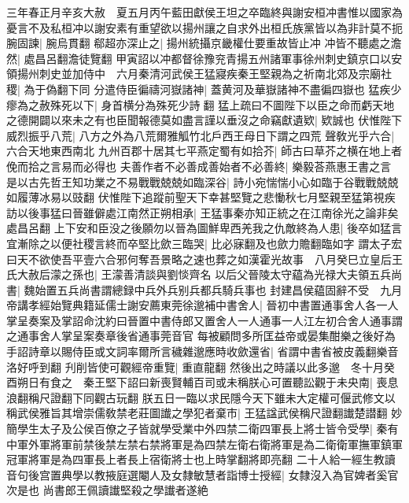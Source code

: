 三年春正月辛亥大赦　夏五月丙午藍田獻侯王坦之卒臨終與謝安桓冲書惟以國家為憂言不及私桓冲以謝安素有重望欲以揚州讓之自求外出桓氏族黨皆以為非計莫不扼腕固諫|{
	腕烏貫翻}
郗超亦深止之|{
	揚州統攝京畿權仕要重故皆止冲}
冲皆不聽處之澹然|{
	處昌呂翻澹徒覽翻}
甲寅詔以冲都督徐豫兖青揚五州諸軍事徐州刺史鎮京口以安領揚州刺史並加侍中　六月秦清河武侯王猛寢疾秦王堅親為之祈南北郊及宗廟社稷|{
	為于偽翻下同}
分遣侍臣徧禱河嶽諸神|{
	蓋黄河及華嶽諸神不盡徧四嶽也}
猛疾少瘳為之赦殊死以下|{
	身首横分為殊死少詩翻}
猛上疏曰不圖陛下以臣之命而虧天地之德開闢以來未之有也臣聞報德莫如盡言謹以垂沒之命竊獻遺欵|{
	欵誠也}
伏惟陛下威烈振乎八荒|{
	八方之外為八荒爾雅觚竹北戶西王母日下謂之四荒}
聲敎光乎六合|{
	六合天地東西南北}
九州百郡十居其七平燕定蜀有如拾芥|{
	師古曰草芥之横在地上者俛而拾之言易而必得也}
夫善作者不必善成善始者不必善終|{
	樂毅荅燕惠王書之言}
是以古先哲王知功業之不易戰戰兢兢如臨深谷|{
	詩小宛惴惴小心如臨于谷戰戰兢兢如履薄冰易以豉翻}
伏惟陛下追蹤前聖天下幸甚堅覽之悲慟秋七月堅親至猛第視疾訪以後事猛曰晉雖僻處江南然正朔相承|{
	王猛事秦亦知正統之在江南徐光之論非矣處昌呂翻}
上下安和臣没之後願勿以晉為圖鮮卑西羌我之仇敵終為人患|{
	後卒如猛言}
宜漸除之以便社稷言終而卒堅比歛三臨哭|{
	比必寐翻及也歛力贍翻臨如字}
謂太子宏曰天不欲使吾平壹六合邪何奪吾景略之速也葬之如漢霍光故事　八月癸巳立皇后王氏大赦后濛之孫也|{
	王濛善清談與劉惔齊名}
以后父晉陵太守藴為光禄大夫領五兵尚書|{
	魏始置五兵尚書謂總録中兵外兵别兵都兵騎兵事也}
封建昌侯藴固辭不受　九月帝講孝經始覽典籍延儒士謝安薦東莞徐邈補中書舍人|{
	晉初中書置通事舍人各一人掌呈奏案及掌詔命沈約曰晉置中書侍郎又置舍人一人通事一人江左初合舍人通事謂之通事舍人掌呈案奏章後省通事莞音官}
每被顧問多所匡益帝或晏集酣樂之後好為手詔詩章以賜侍臣或文詞率爾所言穢雜邈應時收歛還省|{
	省謂中書省被皮義翻樂音洛好呼到翻}
刋削皆使可觀經帝重覽|{
	重直龍翻}
然後出之時議以此多邈　冬十月癸酉朔日有食之　秦王堅下詔曰新喪賢輔百司或未稱朕心可置聽訟觀于未央南|{
	喪息浪翻稱尺證翻下同觀古玩翻}
朕五日一臨以求民隱今天下雖未大定權可偃武修文以稱武侯雅旨其增崇儒敎禁老莊圖䜟之學犯者棄市|{
	王猛諡武侯稱尺證翻䜟楚譛翻}
妙簡學生太子及公侯百僚之子皆就學受業中外四禁二衛四軍長上將士皆令受學|{
	秦有中軍外軍將軍前禁後禁左禁右禁將軍是為四禁左衛右衛將軍是為二衛衛軍撫軍鎮軍冠軍將軍是為四軍長上者長上宿衛將士也上時掌翻將即亮翻}
二十人給一經生教讀音句後宫置典學以教掖庭選閹人及女隸敏慧者詣博士授經|{
	女隸沒入為官婢者奚官次是也}
尚書郎王佩讀䜟堅殺之學䜟者遂絶

